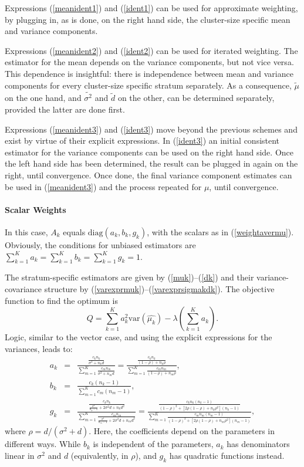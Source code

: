 \documentclass[11pt,a5paper,twoside]{book}
\let\oldparagraph\paragraph
\renewcommand{\paragraph}[1]{\oldparagraph{#1}\mbox{}}
\begin{document}
Expressions (\ref{meanident1}) and (\ref{ident1}) can be 
used for approximate weighting, by plugging in, as is done, 
on the right hand side, the cluster-size specific mean and 
variance components.

Expressions (\ref{meanident2}) and (\ref{ident2}) can be used 
for iterated weighting. 
The estimator for the mean depends on the variance 
components, but not vice versa. This dependence is insightful: 
there is independence between mean and variance components for 
every cluster-size specific stratum separately. As a consequence, 
$\widetilde{\mu}$ on the one hand, and $\widetilde{\sigma^2}$ and 
$\widetilde{d}$ on the other, can be determined separately, 
provided the latter are done first.

Expressions (\ref{meanident3}) and (\ref{ident3}) move beyond 
the previous schemes and exist by virtue of their explicit 
expressions. In (\ref{ident3}) an initial consistent estimator 
for the variance components can be used on the right hand side. 
Once the left hand side has been determined, the result can be 
plugged in again on the right, until convergence. Once done, 
the final variance component estimates can be used in 
(\ref{meanident3}) and the process repeated for $\mu$, 
until convergence.

\paragraph{Scalar Weights}\label{scalarcs}

In this case, $A_k$ equals $\mbox{diag}(a_k,b_k,g_k)$, with 
the scalars as in
(\ref{weightavermu}). Obviously, the 
conditions for  unbiased estimators are 
$\sum_{k=1}^Ka_k=\sum_{k=1}^Kb_k=\sum_{k=1}^Kg_k=1$.

The stratum-specific estimators are given by (\ref{muk})--(\ref{dk}) 
and their variance-covariance structure by  
(\ref{varexprmuk})--(\ref{varexprsigmakdk}). 
The objective function to find the optimum is
$$Q=\sum_{k=1}^Ka_k^2\mbox{var}(\widehat{\mu_k})-\lambda\left(\sum_{k=1}^Ka_k\right).$$
Logic, similar to the vector case, and using the explicit 
expressions for the variances, leads to:
\begin{eqnarray}
\label{akbasic}
a_k&=&\frac
{
\frac{c_kn_k}{\sigma^2+n_kd}
}
{
\sum_{m=1}^K\frac{c_mn_m}{\sigma^2+n_md}
}
=
\frac
{
\frac{c_kn_k}{(1-\rho)+n_k\rho}
}
{
\sum_{m=1}^K\frac{c_mn_m}{(1-\rho)+n_m\rho}
}
,\\[2mm]
\label{bkbasic}
b_k&=&\frac
{
c_k(n_k-1)
}
{
\sum_{m=1}^Kc_m(n_m-1)
},\\[2mm]
\label{gkbasic}
g_k&=&\frac
{
\frac{c_kn_k}{\frac{\sigma^4}{n_k-1}+2\sigma^2d+n_kd^2}
}
{
\sum_{m=1}^K
\frac{c_mn_m}{\frac{\sigma^4}{n_m-1}+2\sigma^2d+n_md^2}
}
=
\frac
{
\frac{c_kn_k(n_k-1)}{(1-\rho)^2+[2\rho(1-\rho)+n_k\rho^2](n_k-1)}
}
{
\sum_{m=1}^K
\frac{c_mn_m(n_m-1)}{(1-\rho)^2+[2\rho(1-\rho)+n_m\rho^2](n_m-1)}
}
,
\end{eqnarray}
where $\rho=d/(\sigma^2+d)$.
Here, the coefficients depend on 
the parameters in different ways. While $b_k$ is independent of 
the parameters, $a_k$ has denominators linear in $\sigma^2$ and 
$d$ (equivalently, in $\rho$), and $g_k$ has quadratic functions instead.
\end{document}
